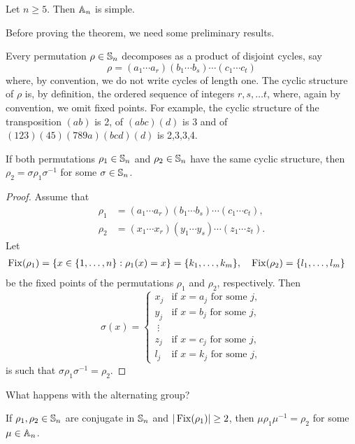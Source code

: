 \begin{theorem}[Jordan]
\label{thm:Jordan}
    Let $n\geq5$. Then $\mathbb{A}_n$ is simple. 
\end{theorem}

Before proving the theorem, we need some preliminary results.

Every permutation $\rho\in\mathbb{S}_n$ decomposes as a product of disjoint cycles, say
\[
\rho=(a_1\cdots a_r)(b_1\cdots b_s)\cdots (c_1\cdots c_t)
\]
where, by convention, we do not write cycles of length one. 
The cyclic structure of $\rho$ is, by definition, the ordered 
sequence of integers $r,s,\dots t$, where, again by convention,  
we omit fixed points. For example, the cyclic structure of 
the transposition $(ab)$ is 2, 
of $(abc)(d)$ is 3 and of $(123)(45)(789a)(bcd)(d)$ is 2,3,3,4. 

\begin{lemma}
If both permutations $\rho_1\in\mathbb{S}_n$ and $\rho_2\in\mathbb{S}_n$ have the same
cyclic structure, then 
$\rho_2=\sigma\rho_1\sigma^{-1}$ for some
$\sigma\in\mathbb{S}_n$. 
\end{lemma}

\begin{proof}
Assume that 
\begin{align*}
\rho_1&=(a_1\cdots a_r)(b_1\cdots b_s)\cdots (c_1\cdots c_t),\\
\rho_2&=(x_1\cdots x_r)(y_1\cdots y_s)\cdots (z_1\cdots z_t).
\end{align*}
Let  
\begin{align*}
\operatorname{Fix}(\rho_1) &= \{x\in\{1,\dots,n\}:\rho_1(x)=x\}=\{k_1,\dots,k_m\},&&
\operatorname{Fix}(\rho_2)=\{l_1,\dots,l_m\}	
\end{align*}
be the fixed points of the permutations $\rho_1$ and $\rho_2$,
respectively. Then 
\[
\sigma(x)=\begin{cases}
x_j & \text{if $x=a_j$ for some $j$},\\
y_j & \text{if $x=b_j$ for some $j$},\\
\;\vdots\\
z_j & \text{if $x=c_j$ for some $j$},\\
l_j & \text{if $x=k_j$ for some $j$},	
\end{cases}
\]
is such that $\sigma\rho_1\sigma^{-1}=\rho_2$. 
\end{proof}

What happens with the alternating group? 

\begin{lemma}
If $\rho_1,\rho_2\in\mathbb{S}_n$ are conjugate in $\mathbb{S}_n$ and  $|\operatorname{Fix}(\rho_1)|\geq2$, then 
$\mu\rho_1\mu^{-1}=\rho_2$ for some $\mu\in\mathbb{A}_n$.  
\end{lemma}

